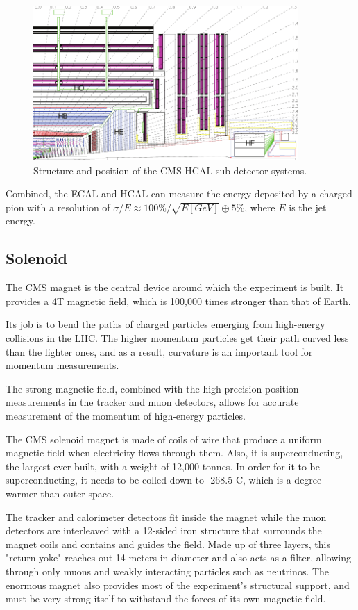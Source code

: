      \begin{figure}[h]
 	\centering
 	\includegraphics[width=0.9\textwidth]{figures/HCAL_subdet.pdf}
 	\singlespace
 	\caption{Structure and position of the CMS HCAL sub-detector systems.}
 	\label{fig:cmshcal}
	 \end{figure}

Combined, the ECAL and HCAL can measure the energy deposited by a charged pion with a resolution of $\sigma/E\approx100\%/\sqrt{E[GeV]}\oplus5\%$, where $E$ is the jet energy.

 \subsection{Solenoid}

 The CMS magnet is the central device around which the experiment is built. It provides a 4T magnetic field, which is 100,000 times stronger than that of Earth.

 Its job is to bend the paths of charged particles emerging from high-energy collisions in the LHC. The higher momentum particles get their path curved less than the lighter ones, and as a result, curvature is an important tool for momentum measurements. 

 The strong magnetic field, combined with the high-precision position measurements in the tracker and muon detectors, allows for accurate measurement of the momentum of high-energy particles.

 The CMS solenoid magnet is made of coils of wire that produce a uniform magnetic field when electricity flows through them. Also, it is superconducting, the largest ever built, with a weight of 12,000 tonnes. In order for it to be superconducting, it needs to be colled down to -268.5 C, which is a degree warmer than outer space.

 The tracker and calorimeter detectors fit inside the magnet while the muon detectors are interleaved with a 12-sided iron structure that surrounds the magnet coils and contains and guides the field. Made up of three layers, this "return yoke" reaches out 14 meters in diameter and also acts as a filter, allowing through only muons and weakly interacting particles such as neutrinos. The enormous magnet also provides most of the experiment's structural support, and must be very strong itself to withstand the forces of its own magnetic field.


